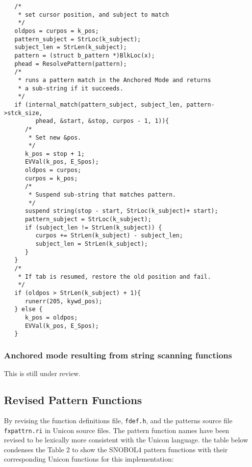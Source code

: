 \documentclass{article}
\begin{document}
\begin{verbatim}
   /*
    * set cursor position, and subject to match
    */
   oldpos = curpos = k_pos;
   pattern_subject = StrLoc(k_subject);
   subject_len = StrLen(k_subject);
   pattern = (struct b_pattern *)BlkLoc(x);
   phead = ResolvePattern(pattern);
   /*
    * runs a pattern match in the Anchored Mode and returns
    * a sub-string if it succeeds.
    */	
   if (internal_match(pattern_subject, subject_len, pattern->stck_size,
         phead, &start, &stop, curpos - 1, 1)){
      /*
       * Set new &pos.
       */ 
      k_pos = stop + 1;
      EVVal(k_pos, E_Spos);	
      oldpos = curpos;
      curpos = k_pos;
      /*
       * Suspend sub-string that matches pattern.
       */
      suspend string(stop - start, StrLoc(k_subject)+ start);
      pattern_subject = StrLoc(k_subject);
      if (subject_len != StrLen(k_subject)) {
         curpos += StrLen(k_subject) - subject_len;
         subject_len = StrLen(k_subject);
      }
   }
   /*
    * If tab is resumed, restore the old position and fail.
    */
   if (oldpos > StrLen(k_subject) + 1){
      runerr(205, kywd_pos);
   } else {
      k_pos = oldpos;
      EVVal(k_pos, E_Spos);
   }
\end{verbatim}

\subsubsection{Anchored mode resulting from string scanning functions}
This is still under review.

\subsection{Revised Pattern Functions}
By revising the function definitions file, \texttt{fdef.h}, and the patterns source file \texttt{fxpattrn.ri} in Unicon source files.  The pattern function names have been revised to be lexically more consistent with the Unicon language.  the table below condenses the Table 2 to show the SNOBOL4 pattern functions with their corresponding Unicon functions for this implementation:  
\end{document}
